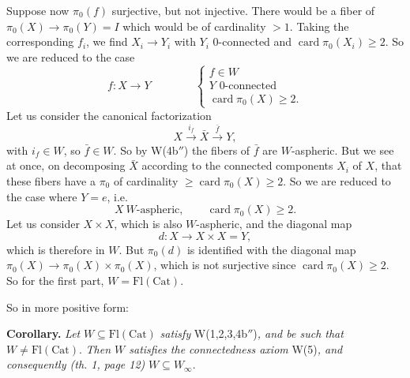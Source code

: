 \documentclass[11pt]{article}
\newcommand{\msp}[1]{\marginpar{\footnotesize [#1]}}
\newcommand{\Fl}{\mathrm{Fl}}
\newcommand{\Cat}{\mathrm{Cat}}
\newcommand{\card}{\operatorname{card}}
\begin{document}
Suppose now $\pi_0(f)$ surjective, but not injective. There would be a fiber of $\pi_0(X) \longrightarrow \pi_0(Y) = I$ which would be of cardinality $> 1$. Taking the corresponding $f_i$, we find $X_i \longrightarrow Y_i$ with $Y_i$ 0-connected and $\card \pi_0(X_i) \geq 2$. So we are reduced to the case
\[
f : X \longrightarrow Y \qquad\qquad \left\{
\begin{array}{l}
f \in W \\[1ex]
Y \text{ 0-connected} \\[1ex]
\card \pi_0(X) \geq 2.
\end{array}
\right.
\]
Let us consider the canonical factorization
\[
X \xrightarrow{i_f} \bar{X} \xrightarrow{\bar{f}} Y,
\]
with $i_f \in W$, so $\bar{f} \in W$. So by W(4b$''$) the fibers of $\bar{f}$ are $W$-aspheric. But we see at once, on decomposing $\bar{X}$ according to the connected components $X_i$ of $X$, that these fibers have a $\pi_0$ of cardinality $\geq \card \pi_0(X) \geq 2$. So we are reduced to the case where $Y = e$, i.e.
\[
X \ W\text{-aspheric}, \qquad \card \pi_0(X) \geq 2.
\]
Let us consider $X \times X$, which is also $W$-aspheric, and the diagonal map\msp{page 22}
\[
d : X \longrightarrow X \times X = Y,
\]
which is therefore in $W$. But $\pi_0(d)$ is identified with the diagonal map $\pi_0(X) \longrightarrow \pi_0(X) \times \pi_0(X)$, which is not surjective since $\card \pi_0(X) \geq 2$. So for the first part, $W = \Fl(\Cat)$.

So in more positive form:

\textbf{Corollary.} \textit{Let} $W \subseteq \Fl(\Cat)$ \textit{satisfy} W(1,2,3,4b$''$)\textit{, and be such that} $W \neq \Fl(\Cat)$. \textit{Then $W$ satisfies the connectedness axiom} W(5)\textit{, and consequently (th. 1, page 12)} $W \subseteq W_\infty$.
\end{document}
